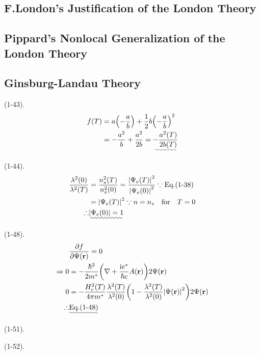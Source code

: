 \subsection{F.London's Justification of the London Theory} %
\label{sub:F.London's Justification of the London Theory}

\subsection{Pippard's Nonlocal Generalization of the London Theory} %
\label{sub:Pippard's Nonlocal Generalization of the London Theory}
\subsection{Ginsburg-Landau Theory} %
\label{sub:Ginsburg-Landau Theory}
(1-43). 
\begin{align}
    f(T) &= a\qty(-\frac{a}{b})+\frac{1}{2}b\qty(-\frac{a}{b})^2 \notag\\
    &= -\frac{a^2}{b}+\frac{a^2}{2b} = \uwave{-\frac{a^2(T)}{2b(T)}} \notag
\end{align}

(1-44). 
\begin{align}
    \frac{\lambda^2(0)}{\lambda^2(T)} &= \frac{n_s^2(T)}{n_s^2(0)} = \frac{\abs{\Psi_e(T)}^2}{\abs{\Psi_e(0)}^2} \because \text{Eq.(1-38)} \notag\\
    &= \abs{\Psi_e(T)}^2\because n=n_s\qfor T=0 \notag\\
    \therefore&\uwave{\abs{\Psi_e(0)}=1} \notag
\end{align}

(1-48). 
\begin{align}
    &\pdv{f}{\Psi(\vb{r})} = 0 \notag\\
    \Rightarrow 0 &= -\frac{\hbar^2}{2m^*}\qty(\nabla +\frac{\mathrm{i}e^*}{\hbar c}A(\vb{r}))2\Psi(\vb{r}) \notag\\
    0 &= -\frac{H_c^2(T)}{4\pi m^*}\frac{\lambda^2(T)}{\lambda^2(0)}\qty(1-\frac{\lambda^2(T)}{\lambda^2(0)}\abs{\Psi(\vb{r})}^2)2\Psi(\vb{r}) \notag\\
    \therefore&\uwave{\text{Eq.(1-48)}} \notag
\end{align}

(1-51). 

(1-52). 
